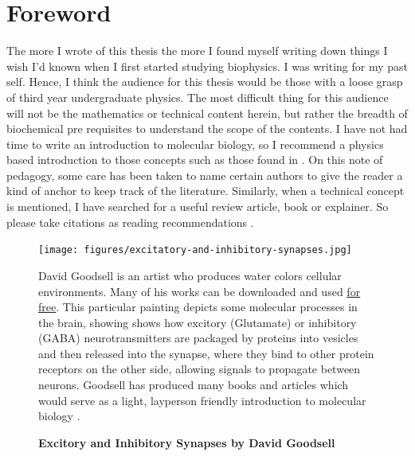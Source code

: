 \setcounter{page}{1}
\chapter*{Foreword}
\label{chap:foreword}
 {}

The more I wrote of this thesis the more I found myself writing down things I wish I'd known when I first started studying biophysics. I was writing for my past self. Hence, I think the audience for this thesis would be those with a loose grasp of third year undergraduate physics. The most difficult thing for this audience will not be the mathematics or technical content herein, but rather the breadth of biochemical pre requisites to understand the scope of the contents. I have not had time to write an introduction to molecular biology, so I recommend a physics based introduction to those concepts such as those found in \cite{phillips2012}. On this note of pedagogy, some care has been taken to name certain authors to give the reader a kind of anchor to keep track of the literature. Similarly, when a technical concept is mentioned, I have searched for a useful review article, book or explainer. So please take citations as reading recommendations \cite{dawkins1989, hofstadter1999}.

\begin{figure}[h]
	\begin{center}
		\texttt{[image: figures/excitatory-and-inhibitory-synapses.jpg]}
	\end{center}
	\captionsetup{singlelinecheck = false, justification=raggedright}
	\caption[Excitory and Inhibitory Synapses by David Goodsell] {\textbf{Excitory and Inhibitory Synapses by David Goodsell}}{David Goodsell is an artist who produces water colors cellular environments. Many of his works can be downloaded and used \href{https://pdb101.rcsb.org/sci-art/goodsell-gallery}{for free}. This particular painting depicts some molecular processes in the brain, showing shows how excitory (Glutamate) or inhibitory (GABA) neurotransmitters are packaged by proteins into vesicles and then released into the synapse, where they bind to other protein receptors on the other side, allowing signals to propagate between neurons. Goodsell has produced many books and articles which would serve as a light, layperson friendly introduction to molecular biology \cite{goodsell2009, goodsell2018, goodsell2020}.}
	\label{goodsell_figure}
\end{figure}

